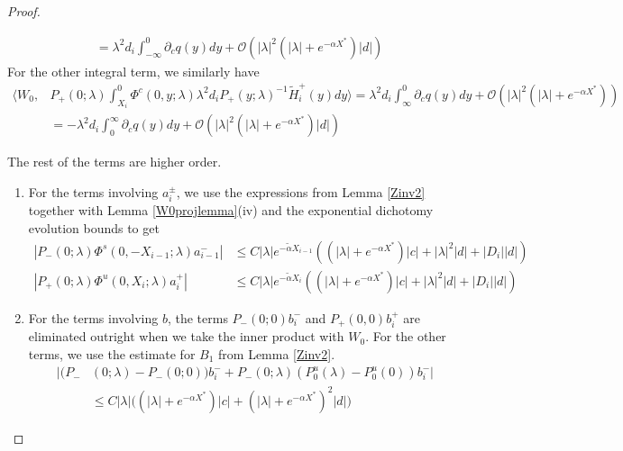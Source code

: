 \documentclass[thesis.tex]{subfiles}
\begin{document}
\begin{lemma}
\begin{proof}
\begin{enumerate}
\begin{align*}
&= \lambda^2 d_i \int_{-\infty}^0 \partial_c q(y)dy + \mathcal{O}(|\lambda|^2( |\lambda| + e^{-\alpha X^*})|d|) 
\end{align*}
For the other integral term, we similarly have
\begin{align*}
\langle W_0, &P_+(0; \lambda) \int_{X_i}^0 \Phi^c(0, y; \lambda) \lambda^2 d_i P_+(y; \lambda)^{-1} \tilde{H}_i^+(y) dy \rangle = \lambda^2 d_i \int_{\infty}^0 \partial_c q(y)dy + \mathcal{O}(|\lambda|^2( |\lambda| + e^{-\alpha X^*})) \\
&= -\lambda^2 d_i \int_0^{\infty} \partial_c q(y)dy + \mathcal{O}(|\lambda|^2( |\lambda| + e^{-\alpha X^*})|d|)
\end{align*}
\end{enumerate}

The rest of the terms are higher order.
\begin{enumerate}

\item For the terms involving $a_i^\pm$, we use the expressions from Lemma \ref{Zinv2} together with Lemma \ref{W0projlemma}(iv) and the exponential dichotomy evolution bounds to get
\begin{align*}
|P_-(0; \lambda) \Phi^s(0, -X_{i-1}; \lambda) a_{i-1}^-| &\leq C |\lambda| e^{-\tilde{\alpha} X_{i-1}} \left( (|\lambda| + e^{-\alpha X^*})|c| + |\lambda|^2 |d| + |D_i||d| \right) \\
|P_+(0; \lambda) \Phi^u(0, X_i; \lambda) a_i^+| &\leq C |\lambda| e^{-\tilde{\alpha} X_i}\left( (|\lambda| + e^{-\alpha X^*})|c| + |\lambda|^2 |d| + |D_i||d| \right) 
\end{align*} 

\item For the terms involving $b$, the terms $P_-(0; 0) b_i^-$ and $P_+(0, 0)b_i^+$ are eliminated outright when we take the inner product with $W_0$. For the other terms, we use the estimate for $B_1$ from Lemma \ref{Zinv2}.
\begin{align*}
|(P_-&(0; \lambda) - P_-(0; 0))b_i^- + P_-(0; \lambda)(P_0^u(\lambda) - P_0^u(0))b_i^-| \\
&\leq C |\lambda|\Big( (|\lambda| + e^{-\alpha X^*})|c| + (|\lambda| + e^{-\alpha X^*})^2 |d| \Big)
\end{align*}


\end{enumerate}
\end{proof}
\end{lemma}
\end{document}

